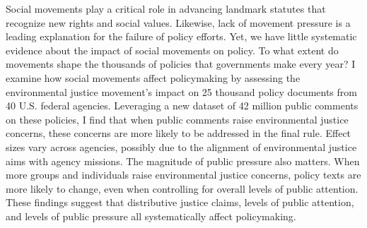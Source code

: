 Social movements play a critical role in advancing landmark statutes that recognize new rights and social values. Likewise, lack of movement pressure is a leading explanation for the failure of policy efforts. Yet, we have little systematic evidence about the impact of social movements on policy. To what extent do movements shape the thousands of policies that governments make every year? I examine how social movements affect policymaking by assessing the environmental justice movement's impact on 25 thousand policy documents from 40 U.S. federal agencies.  Leveraging a new dataset of 42 million public comments on these policies, I find that when public comments raise environmental justice concerns, these concerns are more likely to be addressed in the final rule. Effect sizes vary across agencies, possibly due to the alignment of environmental justice aims with agency missions.
The magnitude of public pressure also matters. When more groups and individuals raise environmental justice concerns, policy texts are more likely to change, even when controlling for overall levels of public attention. These findings suggest that distributive justice claims, levels of public attention, and levels of public pressure all systematically affect policymaking.
